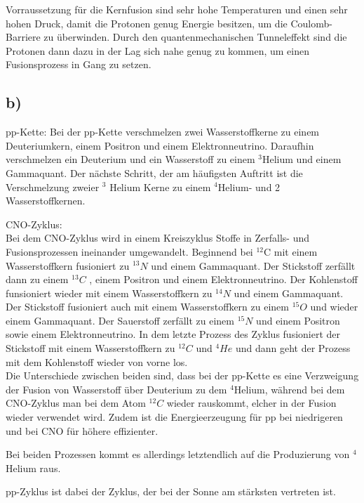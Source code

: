 \justifying Vorraussetzung für die Kernfusion sind sehr hohe Temperaturen und einen sehr hohen Druck, damit die Protonen genug Energie besitzen,
um die Coulomb-Barriere zu überwinden. Durch den quantenmechanischen Tunneleffekt sind die Protonen 
dann dazu in der Lag sich nahe genug zu kommen, um einen Fusionsprozess in Gang zu setzen. 


\subsection{b)}

pp-Kette:
Bei der pp-Kette verschmelzen zwei Wasserstoffkerne zu einem Deuteriumkern, einem Positron und einem Elektronneutrino.
Daraufhin verschmelzen ein Deuterium und ein Wasserstoff zu einem $^3$Helium und einem Gammaquant.
Der nächste Schritt, der am häufigsten Auftritt ist die Verschmelzung zweier $^3$ Helium Kerne zu
einem $^4$Helium- und 2 Wasserstoffkernen.


CNO-Zyklus:\\
Bei dem CNO-Zyklus wird in einem Kreiszyklus Stoffe in Zerfalls- und Fusionsprozessen ineinander umgewandelt.
Beginnend bei $^{12}$C mit einem Wasserstoffkern fusioniert zu $^{13}N $ und einem Gammaquant. 
Der Stickstoff zerfällt dann zu einem $^{13} C$ , einem Positron und einem Elektronneutrino.
Der Kohlenstoff funsioniert wieder mit einem Wasserstoffkern zu $^{14}N $ und einem Gammaquant.
Der Stickstoff fusioniert auch mit einem Wasserstoffkern zu einem $^{15}O $ und wieder einem Gammaquant.
Der Sauerstoff zerfällt zu einem $^{15}N $ und einem Positron sowie einem Elektronneutrino.
In dem letzte Prozess des Zyklus fusioniert der Stickstoff mit einem Wasserstoffkern zu $^{12} C $ und $^4 He$
und dann geht der Prozess mit dem Kohlenstoff wieder von vorne los.\\

Die Unterschiede zwischen beiden sind, dass bei der pp-Kette es eine Verzweigung der Fusion
von Wasserstoff über Deuterium zu dem $^4 $Helium, während bei dem CNO-Zyklus man
bei dem Atom $^{12} C$ wieder rauskommt, elcher in der Fusion wieder verwendet wird.
Zudem ist die Energieerzeugung für pp bei niedrigeren und bei CNO für höhere
effizienter.

Bei beiden Prozessen kommt es allerdings letztendlich auf die Produzierung
von $^4 $Helium raus.

\justifying pp-Zyklus ist dabei der Zyklus, der bei der Sonne am stärksten vertreten ist.

